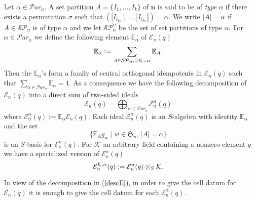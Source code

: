 \documentclass[10pt,a4,twoside,hidelinks,rm]{article}
\newcommand{\kk}{\mathcal{K}}
\newcommand{\Par}{{\mathcal Par}_n}
\newcommand{\Si}{\mathfrak{S}}
\newcommand{\E}{ {\mathcal E}_n(q)}
\newcommand{\Ea}{ {\mathcal E}_n^{\alpha}(q)}
\newcommand{\Eak}{ {\mathcal E}_n^{ {\cal K}, \alpha}(q)}
\newcommand\blambda{{\boldsymbol\lambda}}
\newcommand\be{\mathbb{E}}
\theoremstyle{plain}
\begin{document}
Let $ \alpha \in  \Par$.
A set partition
$A=\{I_{1},\ldots,I_{k}\}$ of $\mathbf{n}$ is said to be of
\textit{type} $\alpha $ if there exists a permutation $\sigma$ such
that $(|I_{i_{1\sigma}}|,\ldots,|I_{i_{k\sigma}}|)=\alpha$. %
We write $|A|=\alpha$ if $A\in \mathcal{SP}_n$ is of type $\alpha$
and we let $ \mathcal{SP}_n^{\alpha} $ be the set of set partitions
of type $ \alpha$. 
For $\alpha\in \Par$  we define the following element $\be_{\alpha}$ of $\E$
\begin{equation}{\label{Ealpha}}
\be_{\alpha}:=\sum_{{A\in \mathcal{SP}_n},\,  |A|=\alpha}\be_{A}.
\end{equation}
Then the $ \be_\alpha $'s form a family of central
orthogonal idempotents in $\E$ such that $ \sum_{ \alpha \in \Par} \be_\alpha = 1 $.
As a consequence we have the following decomposition of $\E$ into a direct sum of two-sided ideals
\begin{equation}\label{descE}
\E=\bigoplus_{\alpha\in\Par} \Ea
\end{equation}
where $\Ea:=\be_{\alpha}\E$.
{Each ideal $ \Ea $ is an $S$-algebra with identity $
\be_{\alpha} $}
and the set 
\begin{equation}\label{basessubalgebras}
 \{\be_{A}g_w\mid w\in\Si_n,\,|A|=\alpha\}
\end{equation}
is an $S$-basis for $\Ea$.
For $ \kk $ an arbitrary field {\color{black}containing} a nonzero element $ q $ we have a specialized version of $ \Ea $
\begin{equation}
\Eak := \Ea \otimes_{S} \kk.
\end{equation}  




In view of the decomposition in (\ref{descE}), in order to give the cell datum for $ \E $ it is enough to 
give the cell datum for each $\Ea$.

\end{document}
